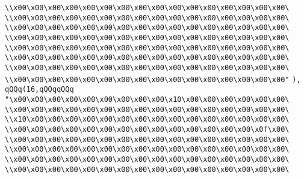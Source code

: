 \verb|\\x00\x00\x00\x00\x00\x00\x00\x00\x00\x00\x00\x00\x00\x00\x00\x00\|\newline
\verb|\\x00\x00\x00\x00\x00\x00\x00\x00\x00\x00\x00\x00\x00\x00\x00\x00\|\newline
\verb|\\x00\x00\x00\x00\x00\x00\x00\x00\x00\x00\x00\x00\x00\x00\x00\x00\|\newline
\verb|\\x00\x00\x00\x00\x00\x00\x00\x00\x00\x00\x00\x00\x00\x00\x00\x00\|\newline
\verb|\\x00\x00\x00\x00\x00\x00\x00\x00\x00\x00\x00\x00\x00\x00\x00\x00\|\newline
\verb|\\x00\x00\x00\x00\x00\x00\x00\x00\x00\x00\x00\x00\x00\x00\x00\x00\|\newline
\verb|\\x00\x00\x00\x00\x00\x00\x00\x00\x00\x00\x00\x00\x00\x00\x00\x00\|\newline
\verb|\\x00\x00\x00\x00\x00\x00\x00\x00\x00\x00\x00\x00\x00\x00\x00\x00"|\newline
\verb|),|\newline
\verb|qQQq(16,qQQqqQQq|\newline
\verb|"\x00\x00\x00\x00\x00\x00\x00\x00\x00\x10\x00\x00\x00\x00\x00\x00\|\newline
\verb|\\x00\x00\x00\x00\x00\x00\x00\x00\x00\x00\x00\x00\x00\x00\x00\x00\|\newline
\verb|\\x10\x00\x00\x00\x00\x00\x00\x00\x00\x00\x00\x00\x00\x00\x00\x00\|\newline
\verb|\\x00\x00\x00\x00\x00\x00\x00\x00\x00\x00\x00\x00\x00\x00\x0f\x00\|\newline
\verb|\\x00\x00\x00\x00\x00\x00\x00\x00\x00\x00\x00\x00\x00\x00\x00\x00\|\newline
\verb|\\x00\x00\x00\x00\x00\x00\x00\x00\x00\x00\x00\x00\x00\x00\x00\x00\|\newline
\verb|\\x00\x00\x00\x00\x00\x00\x00\x00\x00\x00\x00\x00\x00\x00\x00\x00\|\newline
\verb|\\x00\x00\x00\x00\x00\x00\x00\x00\x00\x00\x00\x00\x00\x00\x00\x00\|\newline

